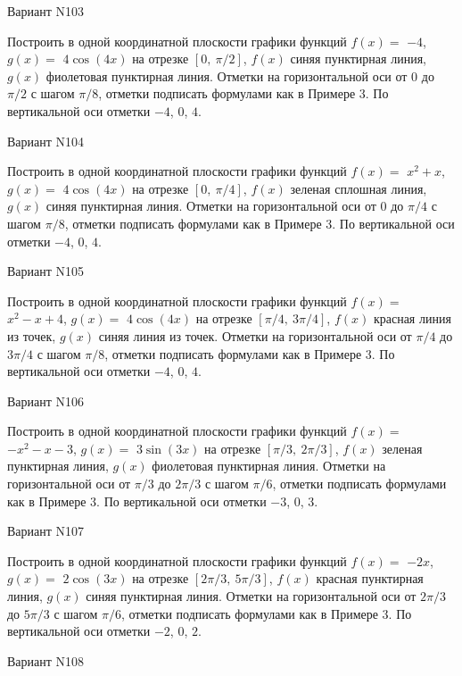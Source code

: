 \documentclass[11pt]{report}
\begin{document}
Вариант N103

Построить в одной координатной плоскости графики функций $f(x) = $
    $-4$, $g(x) = $
    $4 \cos{\left(4 x \right)}$ на 
    отрезке $\left[ 0, \  \pi / 2\right]$, $f(x)$ синяя 
    пунктирная линия, $g(x)$ фиолетовая пунктирная линия. 
    Отметки на горизонтальной оси от $0$ до $\pi / 2$ с 
    шагом $\pi / 8$, отметки подписать формулами как в Примере 3.  
    По вертикальной оси отметки $-4$, 0, $4$.

Вариант N104

Построить в одной координатной плоскости графики функций $f(x) = $
    $x^{2} + x$, $g(x) = $
    $4 \cos{\left(4 x \right)}$ на 
    отрезке $\left[ 0, \  \pi / 4\right]$, $f(x)$ зеленая 
    сплошная линия, $g(x)$ синяя пунктирная линия. 
    Отметки на горизонтальной оси от $0$ до $\pi / 4$ с 
    шагом $\pi / 8$, отметки подписать формулами как в Примере 3.  
    По вертикальной оси отметки $-4$, 0, $4$.

Вариант N105

Построить в одной координатной плоскости графики функций $f(x) = $
    $x^{2} - x + 4$, $g(x) = $
    $4 \cos{\left(4 x \right)}$ на 
    отрезке $\left[ \pi / 4, \  3 \pi / 4\right]$, $f(x)$ красная 
    линия из точек, $g(x)$ синяя линия из точек. 
    Отметки на горизонтальной оси от $\pi / 4$ до $3 \pi / 4$ с 
    шагом $\pi / 8$, отметки подписать формулами как в Примере 3.  
    По вертикальной оси отметки $-4$, 0, $4$.

Вариант N106

Построить в одной координатной плоскости графики функций $f(x) = $
    $- x^{2} - x - 3$, $g(x) = $
    $3 \sin{\left(3 x \right)}$ на 
    отрезке $\left[ \pi / 3, \  2 \pi / 3\right]$, $f(x)$ зеленая 
    пунктирная линия, $g(x)$ фиолетовая пунктирная линия. 
    Отметки на горизонтальной оси от $\pi / 3$ до $2 \pi / 3$ с 
    шагом $\pi / 6$, отметки подписать формулами как в Примере 3.  
    По вертикальной оси отметки $-3$, 0, $3$.

Вариант N107

Построить в одной координатной плоскости графики функций $f(x) = $
    $- 2 x$, $g(x) = $
    $2 \cos{\left(3 x \right)}$ на 
    отрезке $\left[ 2 \pi / 3, \  5 \pi / 3\right]$, $f(x)$ красная 
    пунктирная линия, $g(x)$ синяя пунктирная линия. 
    Отметки на горизонтальной оси от $2 \pi / 3$ до $5 \pi / 3$ с 
    шагом $\pi / 6$, отметки подписать формулами как в Примере 3.  
    По вертикальной оси отметки $-2$, 0, $2$.

Вариант N108
\end{document}
